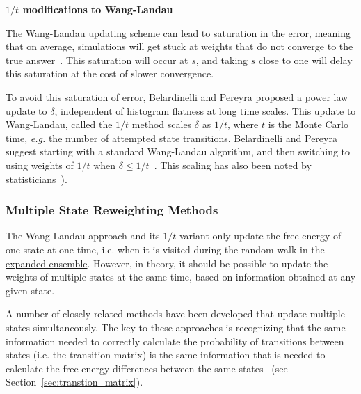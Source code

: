 \documentclass[9pt,review]{livecoms}
\begin{document}
\textbf{$1/t$ modifications to Wang-Landau}

The Wang-Landau updating scheme can lead to saturation in the error,
meaning that on average, simulations will get stuck at weights that do
not converge to the true answer~\cite{Belardinelli2008,
  Belardinelli2007}.  This saturation will occur at $s$, and taking $s$ close to one will delay this saturation at the
cost of slower convergence.

To avoid this saturation of error, Belardinelli and Pereyra proposed a
power law update to $\delta$, independent of histogram flatness at
long time scales. This update to Wang-Landau, called the $1/t$ method
scales $\delta$ as $1/t$, where $t$ is the \hyperlink{ref:MetropolisMonteCarlo} {Monte Carlo} time, \textit{e.g.} the
number of attempted state transitions.  Belardinelli and Pereyra
suggest starting with a standard Wang-Landau algorithm, and then
switching to using weights of $1/t$ when $\delta \leq 1/t$~\cite{Belardinelli2008, Belardinelli2007}. This scaling has also been noted by statisticians~\cite{wl_convergence}).

\subsubsection{\label{sec:multiplestatemethods}Multiple State Reweighting Methods}

The Wang-Landau approach and its $1/t$ variant only update the free energy of one state at one time, i.e. when it is visited during the random walk in the \hyperlink{ref:ExpEns} {expanded ensemble}.  However, in theory, it should be possible to update the weights of multiple states at the same time, based on information obtained at any given state.

A number of closely related methods have been developed that update multiple states simultaneously. The key to these approaches is recognizing that the same information needed to correctly calculate the probability of  transitions between states (i.e. the transition matrix) is the same information that is needed to calculate the free energy differences between the same states~\cite{escobedo_transition_2006,Wang:JoSP:2002} (see Section~\ref{sec:transtion_matrix}). 
\end{document}
